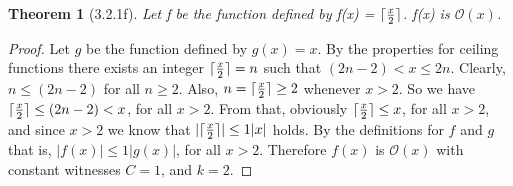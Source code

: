 \documentclass[a4paper, 12pt]{article}
\theoremstyle{plain}
\newtheorem*{theorem*}{Theorem}
\DeclarePairedDelimiter{\ceil}{\lceil}{\rceil}
\begin{document}
	
	\begin{theorem*}[3.2.1f]
		Let f be the function defined by f(x) = $\ceil{\frac{x}{2}}$. \newline f(x) is $\mathcal{O} (x)$.
	\end{theorem*}
	
	\begin{proof}
		Let $g$ be the function defined by $g(x) = x$. By the properties for ceiling functions there exists an integer $\ceil{\frac{x}{2}} = n$ such that $(2n-2) < x \le 2n$. Clearly, $n \le (2n-2)$ for all $n \ge 2$. Also, $n = \ceil{\frac{x}{2}} \ge 2$ whenever $x > 2$. So we have $\ceil{\frac{x}{2}} \le (2n-2) < x$, for all $x > 2$. From that, obviously $\ceil{\frac{x}{2}} \le x$, for all $x > 2$, and since $x > 2$ we know that $|\ceil{\frac{x}{2}}| \le 1|x|$ holds. By the definitions for $f$ and $g$ that is, $|f(x)| \le 1|g(x)|$, for all $x > 2$. Therefore $f(x)$ is $\mathcal{O}(x)$ with constant witnesses $C = 1$, and $k = 2$.
	\end{proof}
\end{document}
